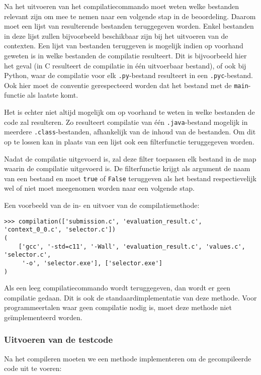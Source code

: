 Na het uitvoeren van het compilatiecommando moet \tested{} weten welke bestanden relevant zijn om mee te nemen naar een volgende stap in de beoordeling.
Daarom moet een lijst van resulterende bestanden teruggegeven worden.
Enkel bestanden in deze lijst zullen bijvoorbeeld beschikbaar zijn bij het uitvoeren van de contexten.
Een lijst van bestanden teruggeven is mogelijk indien op voorhand geweten is in welke bestanden de compilatie resulteert.
Dit is bijvoorbeeld hier het geval (in C resulteert de compilatie in één uitvoerbaar bestand), of ook bij Python, waar de compilatie voor elk \texttt{.py}-bestand resulteert in een \texttt{.pyc}-bestand.
Ook hier moet de conventie gerespecteerd worden dat het bestand met de \texttt{main}-functie als laatste komt.

Het is echter niet altijd mogelijk om op voorhand te weten in welke bestanden de code zal resulteren.
Zo resulteert compilatie van één \texttt{.java}-bestand mogelijk in meerdere \texttt{.class}-bestanden, afhankelijk van de inhoud van de bestanden.
Om dit op te lossen kan in plaats van een lijst ook een filterfunctie teruggegeven worden.

Nadat de compilatie uitgevoerd is, zal \tested{} deze filter toepassen elk bestand in de map waarin de compilatie uitgevoerd is.
De filterfunctie krijgt als argument de naam van een bestand en moet \texttt{true} of \texttt{False} teruggeven als het bestand respectievelijk wel of niet moet meegenomen worden naar een volgende stap.

Een voorbeeld van de in- en uitvoer van de compilatiemethode:

\begin{verbatim}
>>> compilation(['submission.c', 'evaluation_result.c', 'context_0_0.c', 'selector.c'])
(
    ['gcc', '-std=c11', '-Wall', 'evaluation_result.c', 'values.c', 'selector.c',
     '-o', 'selector.exe'], ['selector.exe']
)
\end{verbatim}

Als een leeg compilatiecommando wordt teruggegeven, dan wordt er geen compilatie gedaan.
Dit is ook de standaardimplementatie van deze methode.
Voor programmeertalen waar geen compilatie nodig is, moet deze methode niet geïmplementeerd worden.

\subsubsection{Uitvoeren van de testcode}

Na het compileren moeten we een methode implementeren om de gecompileerde code uit te voeren:

